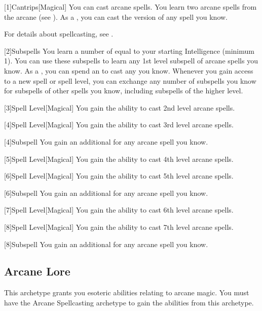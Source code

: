         [1]{Cantrips}[Magical]
        You can cast arcane spells.
        You learn two arcane spells from the arcane  (see ).
        As a , you can cast the  version of any spell you know.

        For details about spellcasting, see .

        [2]{Subspells} You learn a number of  equal to your starting Intelligence  (minimum 1).
        You can use these subspells to learn any 1st level subspell of arcane spells you know.
        As a , you can spend an  to cast any  you know.
        Whenever you gain access to a new spell or spell level, you can exchange any number of subspells you know for subspells of other spells you know, including subspells of the higher level.

        [3]{Spell Level}[Magical] You gain the ability to cast 2nd level arcane spells.

        [4]{Spell Level}[Magical] You gain the ability to cast 3rd level arcane spells.

        [4]{Subspell} You gain an additional  for any arcane spell you know.

        [5]{Spell Level}[Magical] You gain the ability to cast 4th level arcane spells.

        [6]{Spell Level}[Magical] You gain the ability to cast 5th level arcane spells.

        [6]{Subspell} You gain an additional  for any arcane spell you know.

        [7]{Spell Level}[Magical] You gain the ability to cast 6th level arcane spells.

        [8]{Spell Level}[Magical] You gain the ability to cast 7th level arcane spells.

        [8]{Subspell} You gain an additional  for any arcane spell you know.

    \subsection{Arcane Lore}
        This archetype grants you esoteric abilities relating to arcane magic.
        You must have the Arcane Spellcasting archetype to gain the abilities from this archetype.

